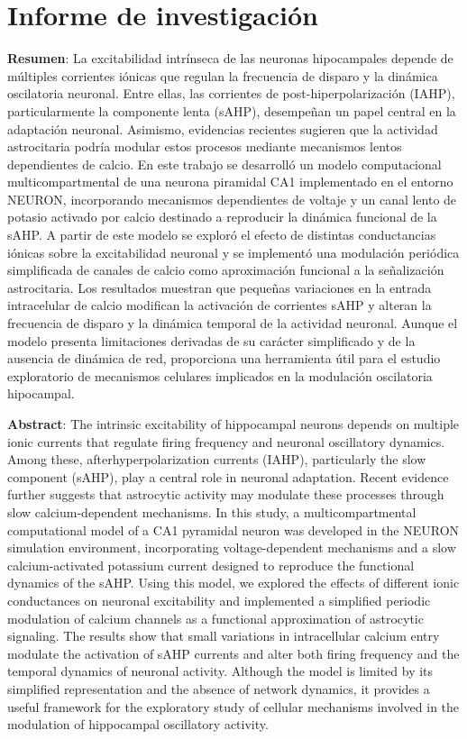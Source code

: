 \documentclass[12pt,a4paper]{report}
\begin{document}
\chapter{Informe de investigación}

\textbf{Resumen}: La excitabilidad intrínseca de las neuronas hipocampales depende de múltiples corrientes iónicas que regulan la frecuencia de disparo y la dinámica oscilatoria neuronal. Entre ellas, las corrientes de post-hiperpolarización (IAHP), particularmente la componente lenta (sAHP), desempeñan un papel central en la adaptación neuronal. Asimismo, evidencias recientes sugieren que la actividad astrocitaria podría modular estos procesos mediante mecanismos lentos dependientes de calcio. En este trabajo se desarrolló un modelo computacional multicompartmental de una neurona piramidal CA1 implementado en el entorno NEURON, incorporando mecanismos dependientes de voltaje y un canal lento de potasio activado por calcio destinado a reproducir la dinámica funcional de la sAHP. A partir de este modelo se exploró el efecto de distintas conductancias iónicas sobre la excitabilidad neuronal y se implementó una modulación periódica simplificada de canales de calcio como aproximación funcional a la señalización astrocitaria. Los resultados muestran que pequeñas variaciones en la entrada intracelular de calcio modifican la activación de corrientes sAHP y alteran la frecuencia de disparo y la dinámica temporal de la actividad neuronal. Aunque el modelo presenta limitaciones derivadas de su carácter simplificado y de la ausencia de dinámica de red, proporciona una herramienta útil para el estudio exploratorio de mecanismos celulares implicados en la modulación oscilatoria hipocampal.

\textbf{Abstract}: The intrinsic excitability of hippocampal neurons depends on multiple ionic currents that regulate firing frequency and neuronal oscillatory dynamics. Among these, afterhyperpolarization currents (IAHP), particularly the slow component (sAHP), play a central role in neuronal adaptation. Recent evidence further suggests that astrocytic activity may modulate these processes through slow calcium-dependent mechanisms. In this study, a multicompartmental computational model of a CA1 pyramidal neuron was developed in the NEURON simulation environment, incorporating voltage-dependent mechanisms and a slow calcium-activated potassium current designed to reproduce the functional dynamics of the sAHP. Using this model, we explored the effects of different ionic conductances on neuronal excitability and implemented a simplified periodic modulation of calcium channels as a functional approximation of astrocytic signaling. The results show that small variations in intracellular calcium entry modulate the activation of sAHP currents and alter both firing frequency and the temporal dynamics of neuronal activity. Although the model is limited by its simplified representation and the absence of network dynamics, it provides a useful framework for the exploratory study of cellular mechanisms involved in the modulation of hippocampal oscillatory activity.
\end{document}
